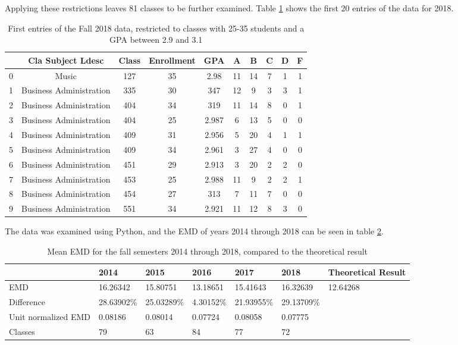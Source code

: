 \documentclass[12pt,letterpaper,oneside,openany]{book}
\begin{document}
Applying these restrictions leaves 81 classes to be further examined. 
Table \ref{tab:fall2018data} shows the first 20 entries of the data for 2018.


\begin{table}[]
	\centering
	\begin{tabular}{c||ccccccccc}
		& Cla Subject Ldesc               & Class & Enrollment & GPA   & A    & B    & C   & D   & F   \\ \hline
		0  & Music                           & 127   & 35                & 2.98  & 11 & 14 & 7 & 1 & 1 \\
		1  & Business Administration         & 335   & 30                & 347 & 12 & 9  & 3 & 3 & 1 \\
		2  & Business Administration         & 404   & 34                & 319 & 11 & 14 & 8 & 0 & 1 \\
		3  & Business Administration         & 404   & 25                & 2.987 & 6  & 13 & 5 & 0 & 0 \\
		4  & Business Administration         & 409   & 31                & 2.956 & 5  & 20 & 4 & 1 & 1 \\
		5  & Business Administration         & 409   & 34                & 2.961 & 3  & 27 & 4 & 0 & 0 \\
		6  & Business Administration         & 451   & 29                & 2.913 & 3  & 20 & 2 & 2 & 0 \\
		7  & Business Administration         & 453   & 25                & 2.988 & 11 & 9  & 2 & 2 & 1 \\
		8  & Business Administration         & 454   & 27                & 313 & 7  & 11 & 7 & 0 & 0 \\
		9  & Business Administration         & 551   & 34                & 2.921 & 11 & 12 & 8 & 3 & 0 
	\end{tabular}
	\caption{First entries of the Fall 2018 data, restricted to classes with 25-35 students and a GPA between 2.9 and 3.1}
	\label{tab:fall2018data}
\end{table}


The data was examined using Python, and the EMD of years 2014 through 2018 can be seen in table \ref{tab:emd_results}.

\begin{table}[]
	\begin{tabular}{l||llllll}
		& 2014     & 2015     & 2016     & 2017     & 2018     & Theoretical Result \\ \hline
		EMD & 16.26342 & 15.80751 & 13.18651 & 15.41643 & 16.32639 & 12.64268           \\
		Difference & 28.63902\% & 25.03289\% & 4.30152\% & 21.93955\% & 29.13709\% \\
		Unit normalized EMD & 0.08186 & 0.08014 & 0.07724 & 0.08058 & 0.07775 \\
		Classes & 79 & 63 & 84 & 77 & 72 
	\end{tabular}
	\caption{Mean EMD for the fall semesters 2014 through 2018, compared to the theoretical result}
	\label{tab:emd_results}
\end{table}
\end{document}
